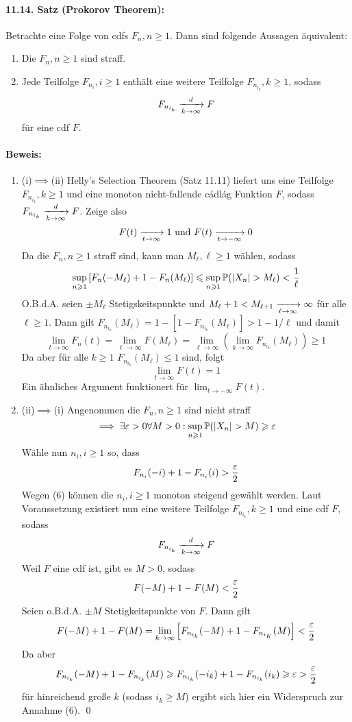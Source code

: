 \documentclass[11pt]{report}
\begin{document}
\paragraph{11.14. Satz (Prokorov Theorem):} Betrachte eine Folge von cdfs $F_n,n\geq1$. Dann sind folgende Aussagen \"aquivalent:
\begin{enumerate}[label=(\roman*)]
    \item Die $F_n,n\geq1$ sind straff.
    \item Jede Teilfolge $F_{n_i},i\geq1$ enth\"alt eine weitere Teilfolge $F_{n_{i_k}},k\geq1$, sodass 
        $$F_{n_{i_k}}\nto{d}{k\to\infty}F$$
        f\"ur eine cdf $F$.
\end{enumerate}

\paragraph{Beweis:}
\begin{enumerate}[label=\Roman*.]
    \item (i)$\implies$(ii)\newline
    Helly's Selection Theorem (Satz 11.11) liefert uns eine Teilfolge $F_{n_{i_k}},k\geq1$ und eine monoton nicht-fallende cádlág Funktion $F$, sodass $F_{n_{i_k}}\nto{d}{k\to\infty}F$. Zeige also 
    $$F(t)\nto{}{t\to\infty}1\text{ und }F(t)\nto{}{t\to-\infty}0$$
    Da die $F_n,n\geq1$ straff sind, kann man $M_\ell,\ell\geq1$ w\"ahlen, sodass
    $$\sup_{n\geq1}\left[F_n(-M_\ell)+1-F_n(M_\ell)\right]\leq\sup_{n\geq1}\Pp(|X_n|>M_\ell)<\dfrac{1}{\ell}$$
    O.B.d.A. seien $\pm M_\ell$ Stetigskeitspunkte und $M_\ell+1<M_{\ell+1}\nto{}{\ell\to\infty}\infty$ f\"ur alle $\ell\geq1$. Dann gilt $F_{n_{i_k}}(M_\ell)=1-[1-F_{n_{i_k}}(M_\ell)]>1-1/\ell$
    und damit
    $$\lim_{t\to\infty}F_n(t)=\lim_{\ell\to\infty}F(M_\ell)=\lim_{\ell\to\infty}\left(\lim_{k\to\infty}F_{n_{i_k}}(M_\ell)\right)\geq1$$
    Da aber f\"ur alle $k\geq1$ $F_{n_{i_k}}(M_\ell)\leq1$ sind, folgt
    $$\lim_{t\to\infty}F(t)=1$$
    Ein \"ahnliches Argument funktionert f\"ur $\lim_{t\to-\infty}F(t)$.
    \item (ii)$\implies$(i)\newline
    Angenommen die $F_n,n\geq1$ sind nicht straff
    \begin{equation}
        \implies\exists\eps>0\forall M>0:\sup_{n\geq1}\Pp(|X_n|>M)\geq\eps
    \end{equation}
    W\"ahle nun $n_i,i\geq1$ so, dass
    $$F_{n_i}(-i)+1-F_{n_i}(i)>\dfrac{\varepsilon}{2}$$
    Wegen (6) k\"onnen die $n_i,i\geq1$ monoton steigend gew\"ahlt werden. Laut Voraussetzung existiert nun eine weitere Teilfolge $F_{n_{i_k}},k\geq1$ und eine cdf $F$, sodass
    $$F_{n_{i_k}}\nto{d}{k\to\infty}F$$
    Weil $F$ eine cdf ist, gibt es $M>0$, sodass
    $$F(-M)+1-F(M)<\dfrac{\varepsilon}{2}$$
    Seien o.B.d.A. $\pm M$ Stetigkeitspunkte von $F$. Dann gilt
    $$F(-M)+1-F(M)=\lim_{k\to\infty}\left[F_{n_{i_k}}(-M)+1-F_{n_{i_K}}(M)\right]<\dfrac{\varepsilon}{2}$$
    Da aber 
    $$F_{n_{i_k}}(-M)+1-F_{n_{i_k}}(M)\geqslant F_{n_{i_k}}(-i_k)+1-F_{n_{i_k}}(i_k)\geqslant\varepsilon>\dfrac{\varepsilon}{2}$$
    f\"ur hinreichend gro\ss{}e $k$ (sodass $i_k\geq M$) ergibt sich hier ein Widerspruch zur Annahme (6). \qed
\end{enumerate}
\end{document}
